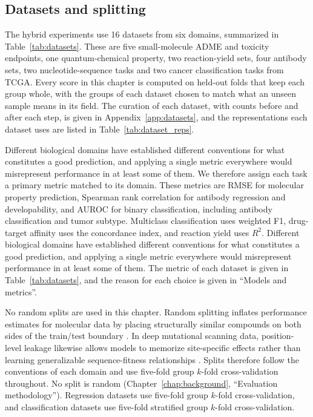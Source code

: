 \subsection{Datasets and splitting}

The hybrid experiments use 16 datasets from six domains, summarized in Table~\ref{tab:datasets}. These are five small-molecule ADME and toxicity endpoints, one quantum-chemical property, two reaction-yield sets, four antibody sets, two nucleotide-sequence tasks and two cancer classification tasks from TCGA. Every score in this chapter is computed on held-out folds that keep each group whole, with the groups of each dataset chosen to match what an unseen sample means in its field. The curation of each dataset, with counts before and after each step, is given in Appendix~\ref{app:datasets}, and the representations each dataset uses are listed in Table~\ref{tab:dataset_reps}.

Different biological domains have established different conventions for what constitutes a good prediction, and applying a single metric everywhere would misrepresent performance in at least some of them. We therefore assign each task a primary metric matched to its domain. These metrics are RMSE for molecular property prediction, Spearman rank correlation for antibody regression and developability, and AUROC for binary classification, including antibody classification and tumor subtype. Multiclass classification uses weighted F1, drug-target affinity uses the concordance index, and reaction yield uses $R^2$.
Different biological domains have established different conventions for what constitutes a good prediction, and applying a single metric everywhere would misrepresent performance in at least some of them. The metric of each dataset is given in Table~\ref{tab:datasets}, and the reason for each choice is given in ``Models and metrics''.

No random splits are used in this chapter. Random splitting inflates performance estimates for molecular data by placing structurally similar compounds on both sides of the train/test boundary \citep{Yang2019, Wallach2018}. In deep mutational scanning data, position-level leakage likewise allows models to memorize site-specific effects rather than learning generalizable sequence-fitness relationships \citep{Notin2023, Vieira2026}. Splits therefore follow the conventions of each domain and use five-fold group $k$-fold cross-validation throughout.
No split is random (Chapter~\ref{chap:background}, ``Evaluation methodology''). Regression datasets use five-fold group $k$-fold cross-validation, and classification datasets use five-fold stratified group $k$-fold cross-validation.

